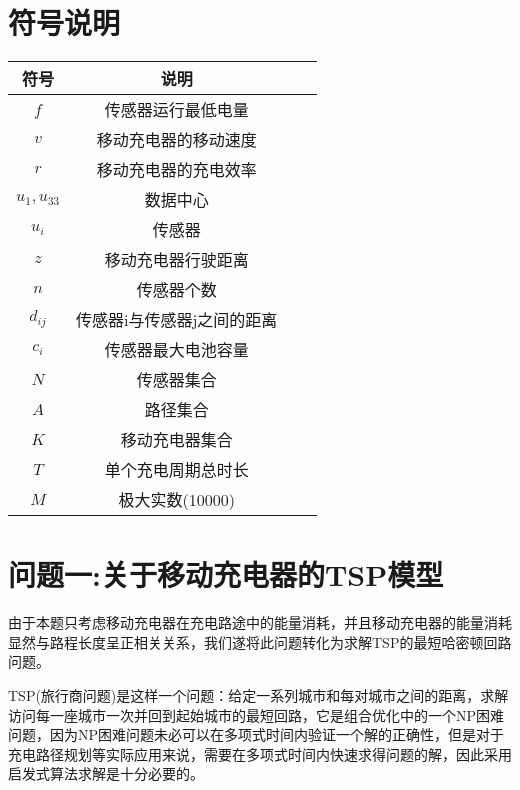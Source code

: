 \documentclass[withoutpreface,bwprint]{cumcmthesis} %
\begin{document}
	\section{符号说明}
	\begin{center}
		\label{tabfuhao}
		\renewcommand{\arraystretch}{2}%
		\setlength\tabcolsep{15pt}%
		\begin{longtable}{cccc}
		\toprule[1.5pt]
		符号 & 说明 \\
		\midrule[1pt]
	$f$ & 传感器运行最低电量   \\
	$v$ & 移动充电器的移动速度\\
	$r$ & 移动充电器的充电效率    \\
	$u_1,u_{33}$ & 数据中心\\
	$u_i$ & 传感器 \\
	$z$ & 移动充电器行驶距离 \\
	$n$ & 传感器个数    \\
	$d_{ij}$ & 传感器i与传感器j之间的距离\\
	$c_i$ & 传感器最大电池容量   \\
	$N$ & 传感器集合 \\
	$A$ & 路径集合  \\
	$K$ & 移动充电器集合 \\
	$T$ & 单个充电周期总时长  \\
	$M$ & 极大实数(10000)\\
		\bottomrule[1.5pt]
		\end{longtable}
	\end{center}

	




	











\section{问题一:关于移动充电器的TSP模型}
由于本题只考虑移动充电器在充电路途中的能量消耗，并且移动充电器的能量消耗显然与路程长度呈正相关关系，我们遂将此问题转化为求解TSP的最短哈密顿回路问题。\par
TSP(旅行商问题)是这样一个问题：给定一系列城市和每对城市之间的距离，求解访问每一座城市一次并回到起始城市的最短回路，它是组合优化中的一个NP困难问题，因为NP困难问题未必可以在多项式时间内验证一个解的正确性，但是对于充电路径规划等实际应用来说，需要在多项式时间内快速求得问题的解，因此采用启发式算法求解是十分必要的。
\end{document}
